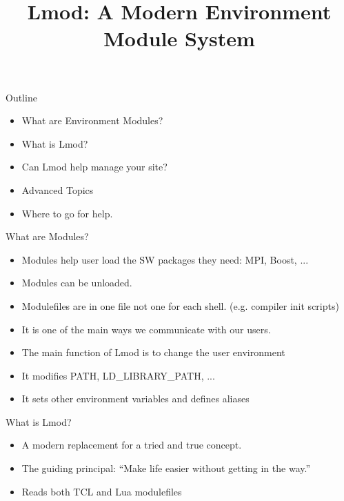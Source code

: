 \documentclass{beamer}
\begin{document}
\title[Lmod]{Lmod: A Modern Environment Module System}

\frame{\titlepage} 

\begin{frame}{Outline}
  \begin{itemize}
    \item What are Environment Modules?
    \item What is Lmod?
    \item Can Lmod help manage your site?
    \item Advanced Topics
    \item Where to go for help.
  \end{itemize}
\end{frame}

\begin{frame}{What are Modules?}
  \begin{itemize}
    \item Modules help user load the SW packages they need: MPI, Boost, ...
    \item Modules can be unloaded.
    \item Modulefiles are in one file not one for each
      shell. (e.g. compiler init scripts)
    \item It is one of the main ways we communicate with our users.
    \item The main function of Lmod is to change the user environment
    \item It modifies PATH, LD\_LIBRARY\_PATH, ...
    \item It sets other environment variables and defines aliases
  \end{itemize}
\end{frame}

\begin{frame}{What is Lmod?}
  \begin{itemize}
    \item A modern replacement for a tried and true concept.
    \item The guiding principal: ``Make life easier without getting in
      the way.''
    \item Reads both TCL and Lua modulefiles
  \end{itemize}
\end{frame}
\end{document}
